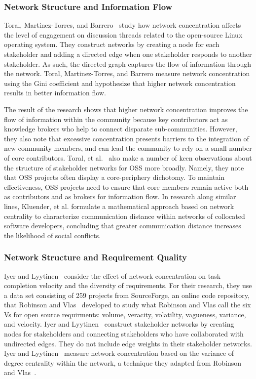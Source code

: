\subsubsection{Network Structure and Information Flow}

Toral, Martinez-Torres, and Barrero~\cite{toral} study how network concentration affects the level of engagement on discussion threads related to the open-source Linux operating system. They construct networks by creating a node for each stakeholder and adding a directed edge when one stakeholder responds to another stakeholder. As such, the directed graph captures the flow of information through the network. Toral, Martinez-Torres, and Barrero measure network concentration using the Gini coefficient and hypothesize that higher network concentration results in better information flow. 

The result of the research shows that higher network concentration improves the flow of information within the community because key contributors act as knowledge brokers who help to connect disparate sub-communities. However, they also note that excessive concentration presents barriers to the integration of new community members, and can lead the community to rely on a small number of core contributors. Toral, et al.~\cite{toral} also make a number of keen observations about the structure of stakeholder networks for OSS more broadly. Namely, they note that OSS projects often display a core-periphery dichotomy. To maintain effectiveness, OSS projects need to ensure that core members remain active both as contributors and as brokers for information flow. In research along similar lines, Kluender, et al. \cite{kluender} formulate a mathematical approach based on network centrality to characterize communication distance within networks of collocated software developers, concluding that greater communication distance increases the likelihood of social conflicts.

\subsubsection{Network Structure and Requirement Quality}

Iyer and Lyytinen~\cite{iyer} consider the effect of network concentration on task completion velocity and the diversity of requirements. For their research, they use a data set consisting of 259 projects from SourceForge, an online code repository, that Robinson and Vlas~\cite{robinson} developed to study what Robinson and Vlas call the six Vs for open source requirments: volume, veracity, volatility, vagueness, variance, and velocity. Iyer and Lyytinen~\cite{iyer} construct stakeholder networks by creating nodes for stakeholders and connecting stakeholders who have collaborated with undirected edges. They do not include edge weights in their stakeholder networks. Iyer and Lyytinen~\cite{iyer} measure network concentration based on the variance of degree centrality within the network, a technique they adapted from Robinson and Vlas~\cite{robinson}.

